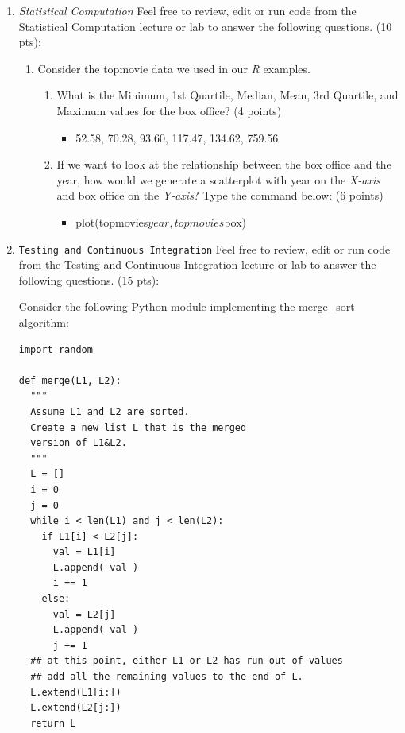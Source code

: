 \documentclass[10pt]{article}
\begin{document}
\begin{enumerate}
\newpage

\item \textit{Statistical Computation} Feel free to review, edit or run code from the Statistical Computation lecture or lab to answer the following questions. (10 pts):
    \begin{enumerate}
    \item Consider the topmovie data we used in our \textit{R} examples. 
	\begin{enumerate}
	\item What is the Minimum, 1st Quartile, Median, Mean, 3rd Quartile, and Maximum values for the box office? (4 points)
	    \beginanswers
		\begin{itemize}
		\item 52.58, 70.28, 93.60, 117.47, 134.62, 759.56
		\end{itemize}
	    \else
	    \bigskip
	    \bigskip
	    \bigskip
	    \bigskip
	    \fi
	\item If we want to look at the relationship between the box office and the year, how would we generate a scatterplot with year on the \textit{X-axis} and box office on the \textit{Y-axis}? Type the command below: (6 points)
            \beginanswers
		\begin{itemize}
		\item plot(topmovies$year, topmovies$box)
		\end{itemize}
	    \else
	    \bigskip
	    \bigskip
	    \bigskip
	    \bigskip
	    \fi
	\end{enumerate}
    \end{enumerate}

\newpage


\item \texttt{Testing and Continuous Integration} Feel free to review, edit or run code from the Testing and Continuous Integration lecture or lab to answer the following questions. (15 pts):
\bigskip

Consider the following Python module implementing the merge\_sort algorithm:
\begin{verbatim}
import random

def merge(L1, L2):
  """
  Assume L1 and L2 are sorted.
  Create a new list L that is the merged
  version of L1&L2.
  """
  L = []
  i = 0
  j = 0
  while i < len(L1) and j < len(L2):
    if L1[i] < L2[j]:
      val = L1[i]
      L.append( val )
      i += 1
    else:
      val = L2[j]
      L.append( val )
      j += 1
  ## at this point, either L1 or L2 has run out of values
  ## add all the remaining values to the end of L.
  L.extend(L1[i:]) 
  L.extend(L2[j:])
  return L


\end{verbatim}
\end{enumerate}
\end{document}
